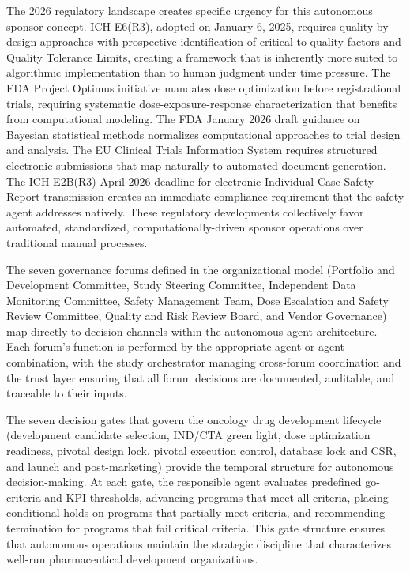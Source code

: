 The 2026 regulatory landscape creates specific urgency for this autonomous sponsor concept.
ICH E6(R3), adopted on January 6, 2025, requires quality-by-design approaches with
prospective identification of critical-to-quality factors and Quality Tolerance Limits,
creating a framework that is inherently more suited to algorithmic implementation than to
human judgment under time pressure. The FDA Project Optimus initiative
\cite{fda-project-optimus} mandates dose optimization before registrational trials,
requiring systematic dose-exposure-response characterization that benefits from computational
modeling. The FDA January 2026 draft guidance on Bayesian statistical methods
\cite{fda-bayesian-guidance} normalizes computational approaches to trial design and analysis.
The EU Clinical Trials Information System \cite{eu-ctis} requires structured electronic
submissions that map naturally to automated document generation. The ICH E2B(R3)
\cite{ich-e2br3} April 2026 deadline for electronic Individual Case Safety Report
transmission creates an immediate compliance requirement that the safety agent addresses
natively. These regulatory developments collectively favor automated, standardized,
computationally-driven sponsor operations over traditional manual processes.

The seven governance forums defined in the organizational model (Portfolio and Development
Committee, Study Steering Committee, Independent Data Monitoring Committee, Safety Management
Team, Dose Escalation and Safety Review Committee, Quality and Risk Review Board, and Vendor
Governance) map directly to decision channels within the autonomous agent architecture. Each
forum's function is performed by the appropriate agent or agent combination, with the study
orchestrator managing cross-forum coordination and the trust layer ensuring that all forum
decisions are documented, auditable, and traceable to their inputs.

The seven decision gates that govern the oncology drug development lifecycle
\cite{tufts-csdd-cost} (development candidate selection, IND/CTA green light, dose
optimization readiness, pivotal design lock, pivotal execution control, database lock and
CSR, and launch and post-marketing) provide the temporal structure for autonomous
decision-making. At each gate, the responsible agent evaluates predefined go-criteria and
KPI thresholds, advancing programs that meet all criteria, placing conditional holds on
programs that partially meet criteria, and recommending termination for programs that fail
critical criteria. This gate structure ensures that autonomous operations maintain the
strategic discipline that characterizes well-run pharmaceutical development organizations.

